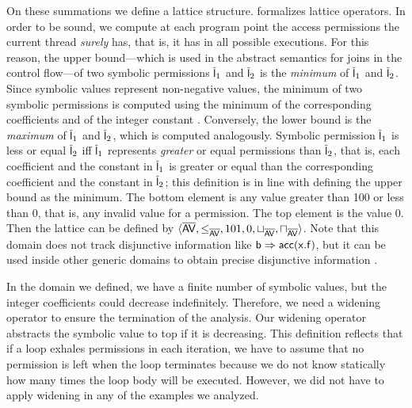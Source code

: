 \documentclass{llncs}
\begin{document}
On these summations we define a lattice structure.
 formalizes lattice operators. In order
to be sound, we compute at each program point the access permissions
the current thread \emph{surely} has, that is, it has in all possible
executions. For this reason, the upper bound---which is used in the
abstract semantics for joins in the control flow---of two symbolic
permissions $\mathsf{\overline{l}}_1$ and $\mathsf{\overline{l}}_2$ is the \emph{minimum} of
$\mathsf{\overline{l}}_1$ and $\mathsf{\overline{l}}_2$. Since symbolic values represent
non-negative values, the minimum of two symbolic permissions is
computed using the minimum of the corresponding coefficients and of
the integer constant . Conversely, the lower bound is the
\emph{maximum} of $\mathsf{\overline{l}}_1$ and $\mathsf{\overline{l}}_2$, which is computed
analogously. Symbolic permission $\mathsf{\overline{l}}_1$ is less or equal $\mathsf{\overline{l}}_2$ iff
$\mathsf{\overline{l}}_1$ represents \emph{greater} or equal permissions than
$\mathsf{\overline{l}}_2$, that is, each coefficient and the constant in $\mathsf{\overline{l}}_1$
is greater or equal than the corresponding coefficient and the
constant in $\mathsf{\overline{l}}_2$; this definition is in line with defining the
upper bound as the minimum.  The bottom element is any value greater
than 100 or less than 0, that is, any invalid value for a
permission. The top element is the value 0. Then the lattice can be
defined by $\langle \mathsf{\overline{AV}}, \leq_{\mathsf{\overline{AV}}}, 101, 0,
\sqcup_{\mathsf{\overline{AV}}}, \sqcap_{\mathsf{\overline{AV}}} \rangle$. Note that this
domain does not track disjunctive information like $\mathsf{b}
\Rightarrow \mathsf{acc}(\mathsf{x.f})$, but it can be used inside
other generic domains to obtain precise disjunctive information
\cite{MR05}.

In the domain we defined, we have a finite number of symbolic values,
but the integer coefficients could decrease indefinitely. Therefore,
we need a widening operator to ensure the termination of the analysis.
Our widening operator abstracts the symbolic value to top if it is
decreasing. This definition reflects that if a loop exhales
permissions in each iteration, we have to assume that no permission is
left when the loop terminates because we do not know statically how
many times the loop body will be executed. However, we did not have to apply 
widening in any of the examples we analyzed.


\end{document}
